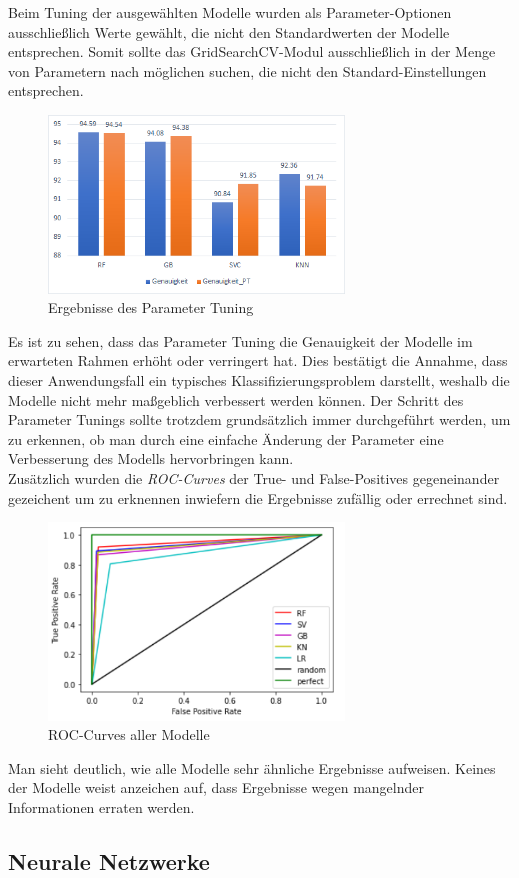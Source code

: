 Beim Tuning der ausgewählten Modelle wurden als Parameter-Optionen ausschließlich Werte gewählt, die nicht 
den Standardwerten der Modelle entsprechen. Somit sollte das GridSearchCV-Modul ausschließlich in der Menge 
von Parametern nach möglichen suchen, die nicht den Standard-Einstellungen entsprechen.

\begin{figure}[h]
    \centering
    \includegraphics[width=0.7\textwidth]{pic/param_eval.png}
    \caption{Ergebnisse des Parameter Tuning}
    \label{fig:PT_eval}
\end{figure}

Es ist zu sehen, dass das Parameter Tuning die Genauigkeit der Modelle im erwarteten Rahmen erhöht oder 
verringert hat. Dies bestätigt die Annahme, dass dieser Anwendungsfall ein typisches Klassifizierungsproblem 
darstellt, weshalb die Modelle nicht mehr maßgeblich verbessert werden können. Der Schritt des Parameter Tunings 
sollte trotzdem grundsätzlich immer durchgeführt werden, um zu erkennen, ob man durch eine einfache Änderung 
der Parameter eine Verbesserung des Modells hervorbringen kann.\\

Zusätzlich wurden die \textit{ROC-Curves} der True- und False-Positives gegeneinander gezeichent um zu erknennen 
inwiefern die Ergebnisse zufällig oder errechnet sind.

\begin{figure}[h]
    \centering
    \includegraphics[width=0.7\textwidth]{pic/roc_curves.png}
    \caption{ROC-Curves aller Modelle}
    \label{fig:PT_eval}
\end{figure}

Man sieht deutlich, wie alle Modelle sehr ähnliche Ergebnisse aufweisen. Keines der Modelle weist anzeichen 
auf, dass Ergebnisse wegen mangelnder Informationen erraten werden.
\subsection{Neurale Netzwerke}
